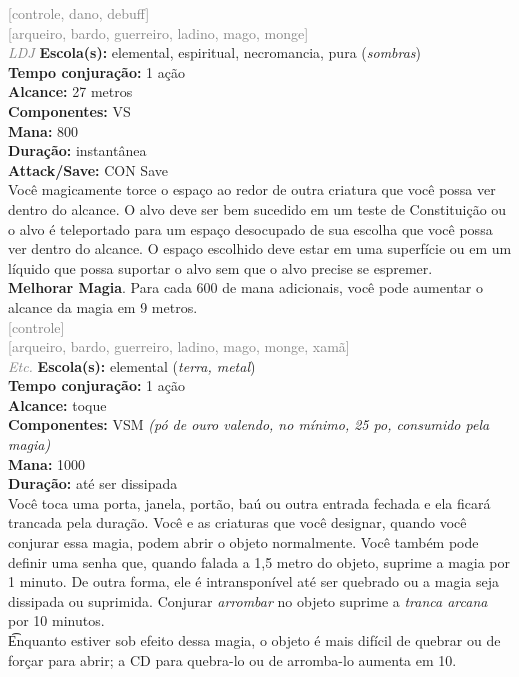 \documentclass{RPG_Adventure}[2021/10/20]
\begin{document}
{\scriptsize \textcolor{gray}{[controle, dano, debuff]\\}}
{\scriptsize \textcolor{gray}{[arqueiro, bardo, guerreiro, ladino, mago, monge]\\}}
{\tiny \textcolor{gray}{\textit{LDJ}}}\jump{}
{\small \t \textbf{Escola(s):} elemental, espiritual, necromancia, pura (\textit{sombras})\\\t \textbf{Tempo conjuração:} 1 ação\\\t \textbf{Alcance:} 27 metros\\\t \textbf{Componentes:} VS\\\t \textbf{Mana:} 800\\\t \textbf{Duração:} instantânea\\\t \textbf{Attack/Save:} CON Save\\}
{\normalsize Você magicamente torce o espaço ao redor de outra criatura que você possa ver dentro do alcance. O alvo deve ser bem sucedido em um teste de Constituição ou o alvo é teleportado para um espaço desocupado de sua escolha que você possa ver dentro do alcance. O espaço escolhido deve estar em uma superfície ou em um líquido que possa suportar o alvo sem que o alvo precise se espremer.\\\t \textbf{Melhorar Magia}. Para cada 600 de mana adicionais, você pode aumentar o alcance da magia em 9 metros.\\}
{\scriptsize \textcolor{gray}{[controle]\\}}
{\scriptsize \textcolor{gray}{[arqueiro, bardo, guerreiro, ladino, mago, monge, xamã]\\}}
{\tiny \textcolor{gray}{\textit{Etc.}}}\jump{}
{\small \t \textbf{Escola(s):} elemental (\textit{terra, metal})\\\t \textbf{Tempo conjuração:} 1 ação\\\t \textbf{Alcance:} toque\\\t \textbf{Componentes:} VSM \textit{(pó de ouro valendo, no mínimo, 25 po, consumido pela magia)}\\\t \textbf{Mana:} 1000\\\t \textbf{Duração:} até ser dissipada\\}
{\normalsize Você toca uma porta, janela, portão, baú ou outra entrada fechada e ela ficará trancada pela duração. Você e as criaturas que você designar, quando você conjurar essa magia, podem abrir o objeto normalmente. Você também pode definir uma senha que, quando falada a 1,5 metro do objeto, suprime a magia por 1 minuto. De outra forma, ele é intransponível até ser quebrado ou a magia seja dissipada ou suprimida. Conjurar \textit{arrombar} no objeto suprime a \textit{tranca arcana} por 10 minutos.\\\t Enquanto estiver sob efeito dessa magia, o objeto é mais difícil de quebrar ou de forçar para abrir; a CD para quebra-lo ou de arromba-lo aumenta em 10.\\}
\end{document}
